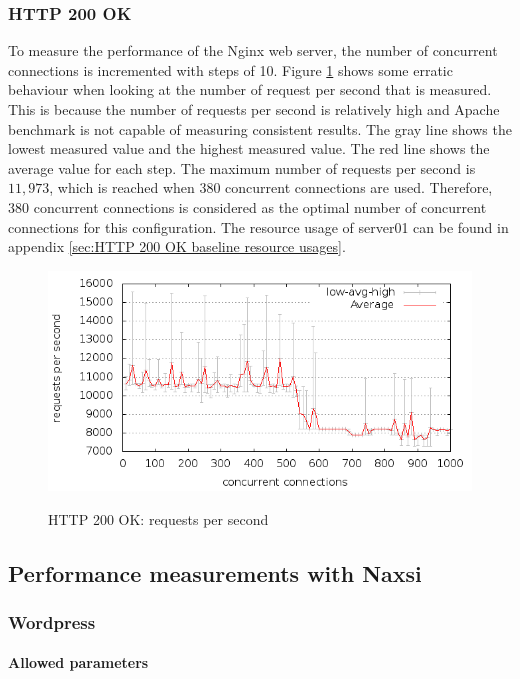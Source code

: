 \documentclass[Experiments]{subfiles}
\begin{document}
\subsubsection{HTTP 200 OK}
To measure the performance of the Nginx web server, the number of concurrent connections is incremented with steps of 10. Figure \ref{fig:HTTP 200 OK: requests per second} shows some erratic behaviour when looking at the number of request per second that is measured. This is because the number of requests per second is relatively high and Apache benchmark is not capable of measuring consistent results. The gray line shows the lowest measured value and the highest measured value. The red line shows the average value for each step. The maximum number of requests per second is $11,973$, which is reached when $380$ concurrent connections are used. Therefore, 380 concurrent connections is considered as the optimal number of concurrent connections for this configuration. The resource usage of server01 can be found in appendix \ref{sec:HTTP 200 OK baseline resource usages}.

\begin{figure}[H]
\caption{HTTP 200 OK: requests per second}
\centering
\includegraphics[scale=0.55] {images/results/baseline_200/output.png}
\label{fig:HTTP 200 OK: requests per second}
\end{figure}

\subsection{Performance measurements with Naxsi}

\subsubsection{Wordpress}

\paragraph*{Allowed parameters}
\end{document}
